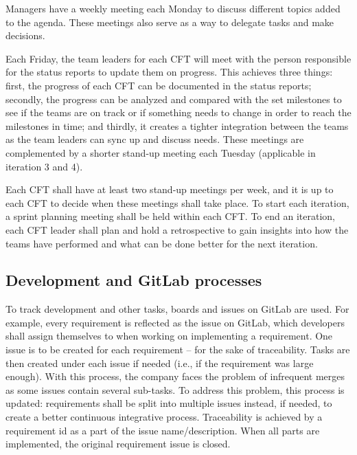 Managers have a weekly meeting each Monday to discuss different topics added to the agenda. These meetings also serve as a way to delegate tasks and make decisions. 

Each Friday, the team leaders for each CFT will meet with the person responsible for the status reports to update them on progress. This achieves three things: first, the progress of each CFT can be documented in the status reports; secondly, the progress can be analyzed and compared with the set milestones to see if the teams are on track or if something needs to change in order to reach the milestones in time; and thirdly, it creates a tighter integration between the teams as the team leaders can sync up and discuss needs. These meetings are complemented by a shorter stand-up meeting each Tuesday (applicable in iteration 3 and 4). 

Each CFT shall have at least two stand-up meetings per week, and it is up to each CFT to decide when these meetings shall take place. To start each iteration, a sprint planning meeting shall be held within each CFT. To end an iteration, each CFT leader shall plan and hold a retrospective to gain insights into how the teams have performed and what can be done better for the next iteration. 

\subsection{Development and GitLab processes}

To track development and other tasks, boards and issues on GitLab are used. For example, every requirement is reflected as the issue on GitLab, which developers shall assign themselves to when working on implementing a requirement. One issue is to be created for each requirement – for the sake of traceability. Tasks are then created under each issue if needed (i.e., if the requirement was large enough). With this process, the company faces the problem of infrequent merges as some issues contain several sub-tasks. To address this problem, this process is updated: requirements shall be split into multiple issues instead, if needed, to create a better continuous integrative process. Traceability is achieved by a requirement id as a part of the issue name/description. When all parts are implemented, the original requirement issue is closed.

